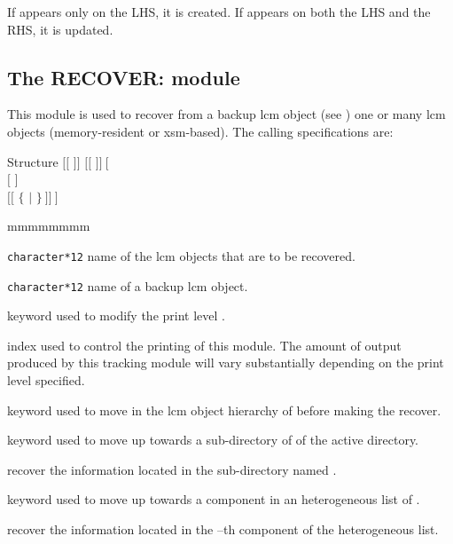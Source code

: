 If  appears only on the LHS, it is created. If 
appears on both the LHS and the RHS, it is updated.

\clearpage

\subsection{The RECOVER: module}\label{sect:RECOVERData}

This module is used to recover from a backup {\sc lcm} object (see
) one or many {\sc lcm} objects (memory-resident or {\sc xsm}-based).
The calling specifications are:

\begin{DataStructure}{Structure }
$[[$  $]]$ \moc{:=}   $[[$  $]]~[$ \moc{::} \\
$[$   $]$ \\
$[[$  $\{$   $|$   $\}~]]~]$ \moc{;}
\end{DataStructure}

\begin{ListeDeDescription}{mmmmmmmm}

\item[\dusa{NAME1}] {\tt character*12} name of the {\sc lcm} objects that are to
be recovered.

\item[\dusa{NAME2}] {\tt character*12} name of a backup {\sc lcm} object.

\item[\moc{EDIT}] keyword used to modify the print level .

\item[\dusa{iprint}] index used to control the printing of this module. The
amount of output produced by this tracking module will vary substantially
depending on the print level specified.

\item[\moc{STEP}] keyword used to move in the {\sc lcm} object hierarchy of  before making the recover.

\item[\moc{UP}] keyword used to move up towards a sub-directory of  of the
active directory.

\item[\dusa{NOMDIR}] recover the information located in the sub-directory named .

\item[\moc{AT}] keyword used to move up towards a component in an heterogeneous list of .

\item[\dusa{index}] recover the information located in the --th component of the heterogeneous list.

\end{ListeDeDescription}

